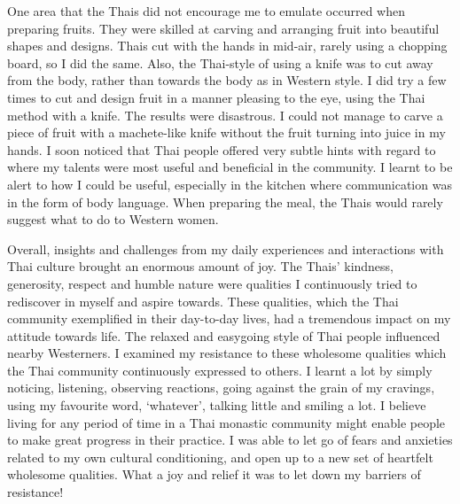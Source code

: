 One area that the Thais did not encourage me to emulate occurred when
preparing fruits. They were skilled at carving and arranging fruit into
beautiful shapes and designs. Thais cut with the hands in mid-air, 
rarely using a chopping board, so I did the same. Also, the Thai-style
of using a knife was to cut away from the body, rather than towards the
body as in Western style. I did try a few times to cut and design fruit
in a manner pleasing to the eye, using the Thai method with a knife. The
results were disastrous. I could not manage to carve a piece of fruit
with a machete-like knife without the fruit turning into juice in my
hands. I soon noticed that Thai people offered very subtle hints with
regard to where my talents were most useful and beneficial in the
community. I learnt to be alert to how I could be useful, especially in
the kitchen where communication was in the form of body language. When
preparing the meal, the Thais would rarely suggest what to do to Western
women. 

Overall, insights and challenges from my daily experiences and
interactions with Thai culture brought an enormous amount of joy. The
Thais' kindness, generosity, respect and humble nature were qualities I
continuously tried to rediscover in myself and aspire towards. These
qualities, which the Thai community exemplified in their day-to-day
lives, had a tremendous impact on my attitude towards life. The relaxed
and easygoing style of Thai people influenced nearby Westerners. I
examined my resistance to these wholesome qualities which the Thai
community continuously expressed to others. I learnt a lot by simply
noticing, listening, observing reactions, going against the grain of my
cravings, using my favourite word, `whatever', talking little and
smiling a lot. I believe living for any period of time in a Thai
monastic community might enable people to make great progress in their
practice. I was able to let go of fears and anxieties related to my own
cultural conditioning, and open up to a new set of heartfelt wholesome
qualities. What a joy and relief it was to let down my barriers of
resistance! 

